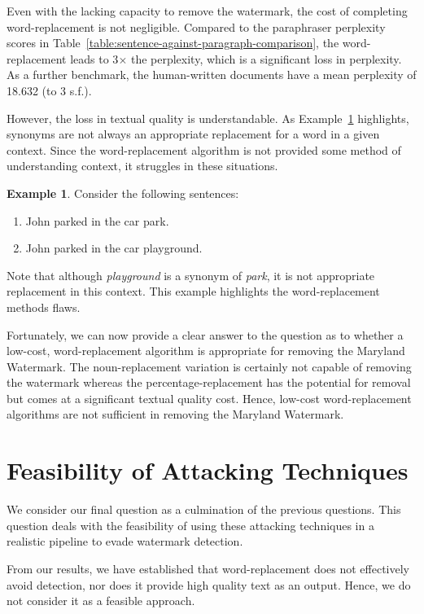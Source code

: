 \documentclass{l4proj}
\theoremstyle{definition}
\newtheorem{example}{Example}[section]
\begin{document}
    Even with the lacking capacity to remove the watermark, the cost of completing word-replacement is not negligible. Compared to the paraphraser perplexity scores in Table~\ref{table:sentence-against-paragraph-comparison}, the word-replacement leads to 3$\times$ the perplexity, which is a significant loss in perplexity. As a further benchmark, the human-written documents have a mean perplexity of 18.632 (to 3 s.f.).

    However, the loss in textual quality is understandable. As Example~\ref{example:bad-synonym} highlights, synonyms are not always an appropriate replacement for a word in a given context. Since the word-replacement algorithm is not provided some method of understanding context, it struggles in these situations. 

    \begin{example} 
        Consider the following sentences:
        \begin{enumerate}[label=(\alph*)]
            \item John parked in the car park.
            \item John parked in the car playground.
        \end{enumerate}
        Note that although \emph{playground} is a synonym of \emph{park}, it is not appropriate replacement in this context. This example highlights the word-replacement methods flaws.
        \label{example:bad-synonym}
    \end{example}

    Fortunately, we can now provide a clear answer to the question as to whether a low-cost, word-replacement algorithm is appropriate for removing the Maryland Watermark. The noun-replacement variation is certainly not capable of removing the watermark whereas the percentage-replacement has the potential for removal but comes at a significant textual quality cost. Hence, low-cost word-replacement algorithms are not sufficient in removing the Maryland Watermark.

\section{Feasibility of Attacking Techniques}
    We consider our final question as a culmination of the previous questions. This question deals with the feasibility of using these attacking techniques in a realistic pipeline to evade watermark detection.

    From our results, we have established that word-replacement does not effectively avoid detection, nor does it provide high quality text as an output. Hence, we do not consider it as a feasible approach. 
\end{document}
